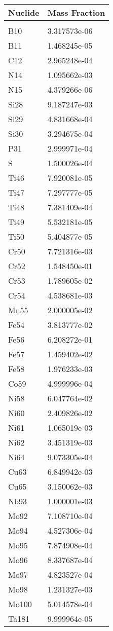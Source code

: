 \begin{centering}
\begin{longtable}[ht!]
\caption{Table showing the isotopic description of material M104}
\label{table:material_M104}
\end{longtable}\clearpage

\begin{longtable}[ht!]
{ p{} | p{} }
\hline
Nuclide & Mass Fraction\\
\hline
\\
B10 & 3.317573e-06\\
B11 & 1.468245e-05\\
C12 & 2.965248e-04\\
N14 & 1.095662e-03\\
N15 & 4.379266e-06\\
Si28 & 9.187247e-03\\
Si29 & 4.831668e-04\\
Si30 & 3.294675e-04\\
P31 & 2.999971e-04\\
S & 1.500026e-04\\
Ti46 & 7.920081e-05\\
Ti47 & 7.297777e-05\\
Ti48 & 7.381409e-04\\
Ti49 & 5.532181e-05\\
Ti50 & 5.404877e-05\\
Cr50 & 7.721316e-03\\
Cr52 & 1.548450e-01\\
Cr53 & 1.789605e-02\\
Cr54 & 4.538681e-03\\
Mn55 & 2.000005e-02\\
Fe54 & 3.813777e-02\\
Fe56 & 6.208272e-01\\
Fe57 & 1.459402e-02\\
Fe58 & 1.976233e-03\\
Co59 & 4.999996e-04\\
Ni58 & 6.047764e-02\\
Ni60 & 2.409826e-02\\
Ni61 & 1.065019e-03\\
Ni62 & 3.451319e-03\\
Ni64 & 9.073305e-04\\
Cu63 & 6.849942e-03\\
Cu65 & 3.150062e-03\\
Nb93 & 1.000001e-03\\
Mo92 & 7.108710e-04\\
Mo94 & 4.527306e-04\\
Mo95 & 7.874908e-04\\
Mo96 & 8.337687e-04\\
Mo97 & 4.823527e-04\\
Mo98 & 1.231327e-03\\
Mo100 & 5.014578e-04\\
Ta181 & 9.999964e-05\\


\end{longtable}
\end{centering}
